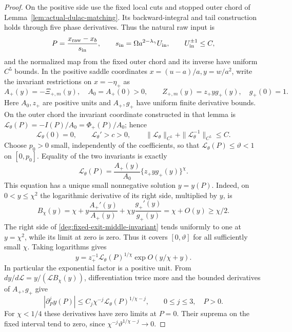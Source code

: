\begin{proof}
On the positive side use the fixed local cuts and stopped outer chord
of Lemma~\ref{lem:actual-dulac-matching}. Its backward-integral and tail
construction holds through five phase derivatives. Thus the natural
raw input is
\begin{equation}\label{deg:fixed-exit-natural-input}
 P=\frac{x_{\rm raw}-x_b}{s_{\rm in}},\qquad
 s_{\rm in}=\Omega a^{2-\lambda_\gamma}U_{\rm in},\qquad
 U_{\rm in}^{\pm1}\le C,
\end{equation}
and the normalized map from the fixed outer chord and its inverse
have uniform \(C^5\) bounds. In the positive saddle coordinates
\(x=(u-a)/a,y=w/a^2\), write the invariant restrictions on
\(x=-\eta_+\) as
\[
 A_+(y)=-\Xi_{+,m}(y),\quad A_0=A_+(0)>0,\qquad
 Z_{+,m}(y)=z_+y g_+(y),\quad g_+(0)=1.
\]
Here \(A_0,z_+\) are positive units and \(A_+,g_+\) have uniform
finite derivative bounds. On the outer chord the invariant coordinate
constructed in that lemma is
\(\mathscr L_\theta(P)=-I(P)/A_0=\Phi_+(P)/A_0\); hence
\[
 \mathscr L_\theta(0)=0,\qquad \mathscr L_\theta'>c>0,\qquad
 \|\mathscr L_\theta\|_{C^5}
       +\|\mathscr L_\theta^{-1}\|_{C^5}\le C.
\]
Choose \(p_0>0\) small, independently of the coefficients, so that
\(\mathscr L_\theta(P)\le\vartheta<1\) on \([0,p_0]\).
Equality of the two invariants is exactly
\begin{equation}\label{deg:fixed-exit-middle-invariant}
 \mathscr L_\theta(P)=\frac{A_+(y)}{A_0}
                         \{z_+y g_+(y)\}^{\chi}.
\end{equation}
This equation has a unique small nonnegative solution \(y=y(P)\).
Indeed, on \(0<y\le\chi^2\) the logarithmic derivative of its
right side, multiplied by \(y\), is
\[
 B_\chi(y)=\chi+y\frac{A_+'(y)}{A_+(y)}
                   +\chi y\frac{g_+'(y)}{g_+(y)}
          =\chi+O(y)\ge\chi/2.
\]
The right side of \eqref{deg:fixed-exit-middle-invariant} tends
uniformly to one at \(y=\chi^2\), while its limit at zero is zero.
Thus it covers \([0,\vartheta]\) for
all sufficiently small \(\chi\). Taking logarithms gives
\[
 y=z_+^{-1}\mathscr L_\theta(P)^{1/\chi}
       \exp O(y/\chi+y).
\]
In particular the exponential factor is a positive unit. From
\(dy/d\mathscr L=y/(\mathscr L B_\chi(y))\), differentiation
twice more and the bounded derivatives of \(A_+,g_+\) give
\begin{equation}\label{deg:fixed-exit-flat-height}
 |\partial_P^j y(P)|\le
 C_j\chi^{-j}\mathscr L_\theta(P)^{1/\chi-j},
 \qquad 0\le j\le3,\quad P>0.
\end{equation}
For \(\chi<1/4\) these derivatives have zero limits at \(P=0\).
Their suprema on the fixed interval tend to zero, since
\(\chi^{-j}\vartheta^{1/\chi-j}\to0\).


\end{proof}
